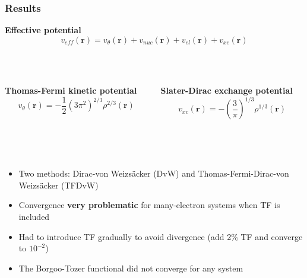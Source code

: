 \documentclass[mathserif, 8pt]{beamer}
\begin{document}
\begin{frame}
    \frametitle{Results}
    \centering
    \textbf{Effective potential}
    \begin{equation}
	\nonumber
	v_{eff}(\boldsymbol{r}) = v_\theta(\boldsymbol{r}) + v_{nuc}(\boldsymbol{r}) + 
	v_{el}(\boldsymbol{r}) + v_{xc}(\boldsymbol{r})
    \end{equation}
    \ \\
    \ \\
    \begin{columns}
    \begin{column}{.5\textwidth}
    \centering
    \textbf{Thomas-Fermi kinetic potential}
    \begin{equation}
        \nonumber
	v_\theta(\boldsymbol{r})= -\frac{1}{2}\left(3\pi^2\right)^{2/3} \rho^{2/3}(\boldsymbol{r})
    \end{equation}
    \end{column}
    \begin{column}{.5\textwidth}
    \centering
    \textbf{Slater-Dirac exchange potential}
    \begin{equation}
        \nonumber
	v_{xc}(\boldsymbol{r}) = -\left(\frac{3}{\pi}\right)^{1/3} \rho^{1/3}(\boldsymbol{r})
    \end{equation}
    \end{column}
    \end{columns}
    \ \\
    \ \\
    \begin{itemize}
	\item	Two methods: Dirac-von Weizs\"{a}cker (DvW) and Thomas-Fermi-Dirac-von Weizs\"{a}cker (TFDvW)
	\item	Convergence \textbf{very problematic} for many-electron systems when TF is included
	\item	Had to introduce TF gradually to avoid divergence (add 2\% TF and converge to $10^{-2}$)
	\item	The Borgoo-Tozer functional did not converge for any system
    \end{itemize}
    \ \\
    \centering

\end{frame}
\end{document}
